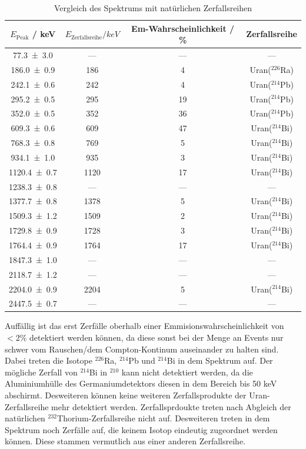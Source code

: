 \begin{table}
  \centering
  \caption{Vergleich des Spektrums mit natürlichen Zerfallsreihen}
  \begin{tabular}{c c c c}
    \toprule
    $E_\text{Peak}$ / keV & $E_\text{Zerfallsreihe} /keV$ & Em-Wahrscheinlichkeit / \% & Zerfallsreihe \\
    \midrule
    \num{77.3+-3.0}	& ---	& ---	& ---	\\
    \num{186.0+-0.9}	& 186	& 4	&Uran($^{226}$Ra)	\\
    \num{242.1+-0.6}	& 242	& 4	&Uran($^{214}$Pb)	\\
    \num{295.2+-0.5}	& 295	& 19	&Uran($^{214}$Pb)	\\
    \num{352.0+-0.5}	& 352	& 36	&Uran($^{214}$Pb)	\\
    \num{609.3+-0.6}	& 609	& 47	&Uran($^{214}$Bi)	\\
    \num{768.3+-0.8}	& 769	& 5	&Uran($^{214}$Bi)	\\
    \num{934.1+-1.0}	& 935	& 3	&Uran($^{214}$Bi)	\\
    \num{1120.4+-0.7}	& 1120	& 17	&Uran($^{214}$Bi)	\\
    \num{1238.3+-0.8}	& ---	& ---	& ---	\\
    \num{1377.7+-0.8}	& 1378	& 5	&Uran($^{214}$Bi)	\\
    \num{1509.3+-1.2}	& 1509	& 2	&Uran($^{214}$Bi)	\\
    \num{1729.8+-0.9}	& 1728	& 3	&Uran($^{214}$Bi)	\\
    \num{1764.4+-0.9}	& 1764	& 17	&Uran($^{214}$Bi)	\\
    \num{1847.3+-1.0}	& ---	& ---	& ---	\\
    \num{2118.7+-1.2}	& ---	& ---	& ---	\\
    \num{2204.0+-0.9}	& 2204	& 5  	&Uran($^{214}$Bi)	\\
    \num{2447.5+-0.7}	& ---	& ---	& ---	\\
  \end{tabular}
  \label{tab:Stone}
\end{table}
Auffällig ist das erst Zerfälle oberhalb einer Emmisionswahrscheinlichkeit von $<2\%$ detektiert werden können, da diese sonst bei der Menge an Events nur schwer vom Rauschen/dem Compton-Kontinum auseinander zu halten sind. Dabei treten die Isotope $^{226}$Ra, $^{214}$Pb und $^{214}$Bi in dem Spektrum auf. Der mögliche Zerfall von $^{214}$Bi in $^{210}$ kann nicht detektiert werden, da die Aluminiumhülle des Germaniumdetektors diesen in dem Bereich bis 50 keV abschirmt. Desweiteren können keine weiteren Zerfallsprodukte der Uran-Zerfallsreihe mehr detektiert werden. Zerfallsprdoukte treten nach Abgleich der natürlichen $^{232}$Thorium-Zerfallsreihe \cite{V18} nicht auf. 
Desweiteren treten in dem Spektrum noch Zerfälle auf, die keinem Isotop eindeutig zugeordnet werden können. Diese stammen vermutlich aus einer anderen Zerfallsreihe. 
